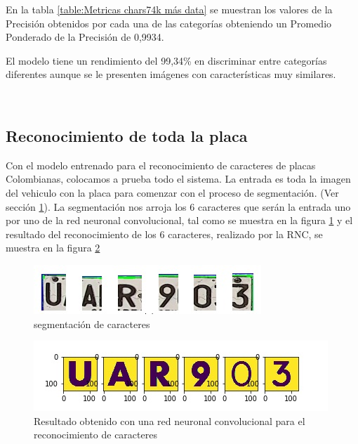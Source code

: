 En la tabla \ref{table:Metricas chars74k más data} se muestran los valores de la Precisión obtenidos por cada una de las categorías obteniendo un Promedio Ponderado de la Precisión de 0,9934.\\

\begin{tcolorbox}
[colback=blue!5!white,colframe=blue!45!black,fonttitle=\bfseries,title=Conclusión 3]
   El modelo tiene un rendimiento del 99,34\% en discriminar entre categorías diferentes aunque se le presenten imágenes con características muy similares.
\end{tcolorbox}\\

\subsection{Reconocimiento de toda la placa}

Con el modelo entrenado para el reconocimiento de caracteres de placas Colombianas, colocamos a prueba todo el sistema. La entrada es toda la imagen del vehiculo con la placa para comenzar con el proceso de segmentación. (Ver sección \ref{fig:segmentación de caracteres}). La segmentación nos arroja los 6 caracteres que ser\'an la entrada uno por uno de la red neuronal convolucional, tal como se muestra en la figura \ref{fig:segmentación de caracteres} y el resultado del reconocimiento de los 6 caracteres, realizado por la RNC, se muestra en la figura \ref{fig:Resultado obtenido con una red neuronal convolucional para el reconocimiento de caracteres chars34k} 


\begin{figure}[H]
\centering
\includegraphics[width=0.7\linewidth]{imagenes/MODELO_4/segmentacion/segmentacion_figura2.jpg} \caption{segmentación de caracteres}
\label{fig:segmentación de caracteres}
\end{figure}

\begin{figure}[H]
\centering
\includegraphics[width=0.9\linewidth]{imagenes/MODELO_4/segmentacion/resultado_carro4.jpg} \caption{Resultado obtenido con una red neuronal convolucional para el reconocimiento de caracteres}
\label{fig:Resultado obtenido con una red neuronal convolucional para el reconocimiento de caracteres chars34k}
\end{figure}

